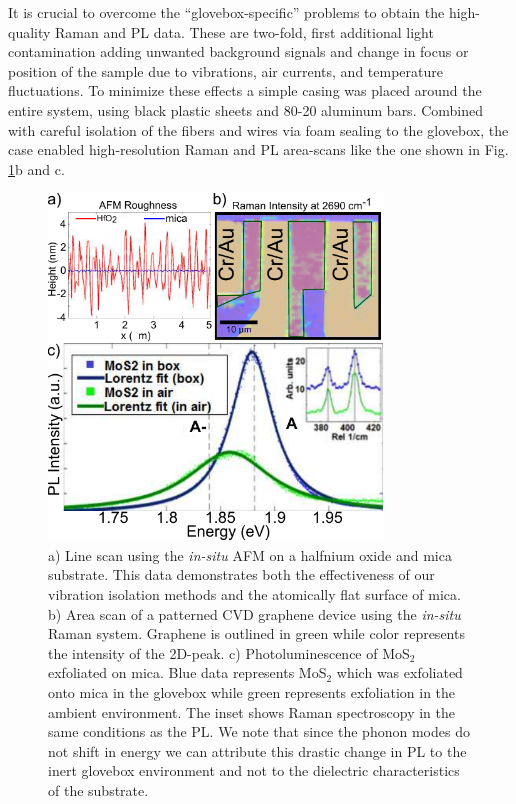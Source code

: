 It is crucial to overcome the ``glovebox-specific'' problems to obtain the high-quality Raman and PL data. These are two-fold, first additional light contamination adding unwanted background signals and change in focus or position of the sample due to vibrations, air currents, and temperature fluctuations. To minimize these effects a simple casing was placed around the entire system, using black plastic sheets and 80-20 aluminum bars. Combined with careful isolation of the fibers and wires via foam sealing to the glovebox, the case enabled high-resolution Raman and PL area-scans like the one shown in Fig. \ref{fig:Characterization}b and c.
\begin{figure}
    \centering
    \includegraphics[width=88.9mm]{Chap2/Figures/CharacterizationFigure.pdf}
    \caption{a) Line scan using the \textit{in-situ} AFM on a halfnium oxide and mica substrate. This data demonstrates both the effectiveness of our vibration isolation methods and the atomically flat surface of mica. b) Area scan of a patterned CVD graphene device using the \textit{in-situ} Raman system. Graphene is outlined in green while color represents the intensity of the 2D-peak. c) Photoluminescence of MoS$_{2}$ exfoliated on mica. Blue data represents MoS$_{2}$ which was exfoliated onto mica in the glovebox while green represents exfoliation in the ambient environment. The inset shows Raman spectroscopy in the same conditions as the PL. We note that since the phonon modes do not shift in energy we can attribute this drastic change in PL to the inert glovebox environment and not to the dielectric characteristics of the substrate.}
    \label{fig:Characterization}
\end{figure}

